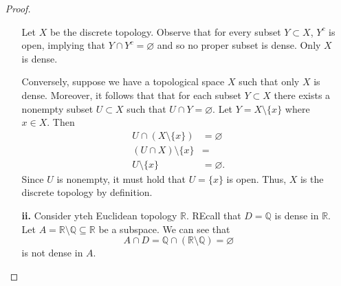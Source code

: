 \documentclass[ 12pt ]{article}
\begin{document}
\begin{enumerate}
\begin{proof}
\begin{enumerate}
					Let $X$ be the discrete topology. Observe that for every subset $Y \subset X$, $Y^c$ is open, implying that $Y \cap Y^c = \varnothing$ and so no proper subset is dense.
					Only $X$ is dense.

					Conversely, suppose we have a topological space $X$ such that only $X$ is dense. Moreover, it follows that that for each subset $Y \subset X$ there exists a nonempty
					subset $U \subset X$ such that $U \cap Y = \varnothing$. Let $Y = X \setminus \{ x \}$ where $x \in X$. Then
					\begin{align*}
						U \cap (X \setminus \{x\}) &= \varnothing \\
						(U \cap X) \setminus \{x\} &= \\
						U \setminus \{x\} &= \varnothing.
					\end{align*}
					Since $U$ is nonempty, it must hold that $U = \{x\}$ is open. Thus, $X$ is the discrete topology by definition.

				\item[\textbf{ii.}] Consider yteh Euclidean topology $\mathbb{R}$. REcall that $D = \mathbb{Q}$ is dense in $\mathbb{R}$. Let $A = \mathbb{R} \setminus \mathbb{Q}
					\subseteq \mathbb{R}$ be a subspace. We can see that $$A \cap D = \mathbb{Q} \cap ( \mathbb{R} \setminus \mathbb{Q}) = \varnothing$$ is not dense in $A$.
			\end{enumerate}
		\end{proof}

\end{enumerate}
\end{document}

